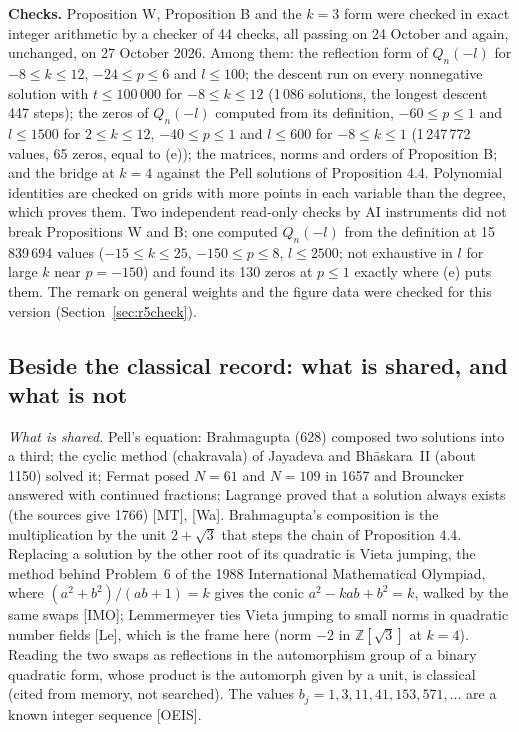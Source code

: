 \documentclass[11pt]{article}
\begin{document}
\medskip
\noindent\textbf{Checks.} Proposition W, Proposition B and the $k=3$ form were checked in exact integer arithmetic by a checker of 44 checks, all passing on 24 October and again, unchanged, on 27 October 2026. Among them: the reflection form of $Q_n(-l)$ for $-8\le k\le12$, $-24\le p\le6$ and $l\le100$; the descent run on every nonnegative solution with $t\le100\,000$ for $-8\le k\le12$ (1\,086 solutions, the longest descent 447 steps); the zeros of $Q_n(-l)$ computed from its definition, $-60\le p\le1$ and $l\le1500$ for $2\le k\le12$, $-40\le p\le1$ and $l\le600$ for $-8\le k\le1$ (1\,247\,772 values, 65 zeros, equal to (e)); the matrices, norms and orders of Proposition B; and the bridge at $k=4$ against the Pell solutions of Proposition 4.4. Polynomial identities are checked on grids with more points in each variable than the degree, which proves them. Two independent read-only checks by AI instruments did not break Propositions W and B; one computed $Q_n(-l)$ from the definition at 15\,839\,694 values ($-15\le k\le25$, $-150\le p\le8$, $l\le2500$; not exhaustive in $l$ for large $k$ near $p=-150$) and found its 130 zeros at $p\le1$ exactly where (e) puts them. The remark on general weights and the figure data were checked for this version (Section~\ref{sec:r5check}).

\subsection{Beside the classical record: what is shared, and what is not}\label{sec:classical}

\noindent\emph{What is shared.} Pell's equation: Brahmagupta (628) composed two solutions into a third; the cyclic method (chakravala) of Jayadeva and Bh\=askara~II (about 1150) solved it; Fermat posed $N=61$ and $N=109$ in 1657 and Brouncker answered with continued fractions; Lagrange proved that a solution always exists (the sources give 1766) [MT], [Wa]. Brahmagupta's composition is the multiplication by the unit $2+\sqrt3$ that steps the chain of Proposition 4.4. Replacing a solution by the other root of its quadratic is Vieta jumping, the method behind Problem~6 of the 1988 International Mathematical Olympiad, where $(a^2+b^2)/(ab+1)=k$ gives the conic $a^2-kab+b^2=k$, walked by the same swaps [IMO]; Lemmermeyer ties Vieta jumping to small norms in quadratic number fields [Le], which is the frame here (norm $-2$ in $\mathbb{Z}[\sqrt3]$ at $k=4$). Reading the two swaps as reflections in the automorphism group of a binary quadratic form, whose product is the automorph given by a unit, is classical (cited from memory, not searched). The values $b_j=1,3,11,41,153,571,\dots$ are a known integer sequence [OEIS].
\end{document}
